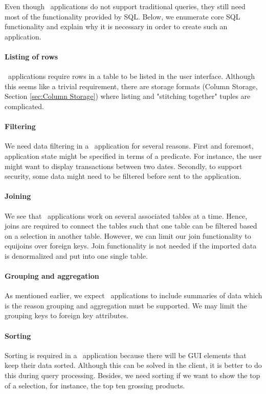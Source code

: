 Even though \bd~applications do not support traditional queries, they still need most of the functionality provided by SQL. Below, we enumerate core SQL functionality and explain why it is necessary in order to create such an application.

\paragraph{Listing of rows}
\bd~applications require rows in a table to be listed in the user interface. Although this seems like a trivial requirement, there are storage formats (Column Storage, Section \ref{sec:Column Storage}) where listing and "stitching together" tuples are complicated. 

\paragraph{Filtering}
We need data filtering in a \bd~application for several reasons. First and foremost, application state might be specified in terms of a predicate. For instance, the user might want to display transactions between two dates. Secondly, to support security, some data might need to be filtered before sent to the application.

\paragraph{Joining}
We see that \bd~applications work on several associated tables at a time. Hence, joins are required to connect the tables such that one table can be filtered based on a selection in another table. However, we can limit our join functionality to equijoins over foreign keys. Join functionality is not needed if the imported data is denormalized and put into one single table.

\paragraph{Grouping and aggregation}
\label{par:Grouping and aggregation}
As mentioned earlier, we expect \bd~applications to include summaries of data which is the reason grouping and aggregation must be supported. We may limit the grouping keys to foreign key attributes.

\paragraph{Sorting}
\label{par:Sorting}
Sorting is required in a \bd~application because there will be GUI elements that keep their data sorted. Although this can be solved in the client, it is better to do this during query processing. Besides, we need sorting if we want to show the top of a selection, for instance, the top ten grossing products.

